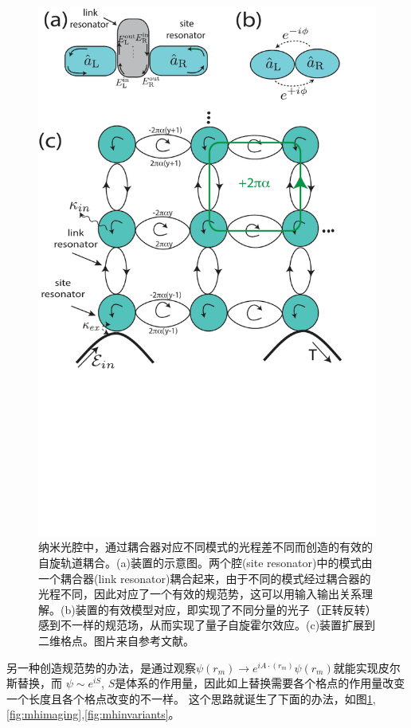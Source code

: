 \documentclass[supercite]{HustGraduPaper}
\begin{document}
\begin{figure}
	\centering
	\includegraphics[width=0.9\linewidth]{Figures/topphoto/MH_lattice}
	\caption{纳米光腔中，通过耦合器对应不同模式的光程差不同而创造的有效的自旋轨道耦合。(a)装置的示意图。两个腔(site resonator)中的模式由一个耦合器(link resonator)耦合起来，由于不同的模式经过耦合器的光程不同，因此对应了一个有效的规范势，这可以用输入输出关系理解。(b)装置的有效模型对应，即实现了不同分量的光子（正转反转）感到不一样的规范场，从而实现了量子自旋霍尔效应。(c)装置扩展到二维格点。图片来自参考文献\cite{hafezi2011robust}。}
	\label{fig:mhlattice}
\end{figure}
另一种创造规范势的办法，是通过观察$\psi(r_m) \to e^{i A\cdot (r_m)} \psi(r_m)$就能实现皮尔斯替换，而
$\psi \sim e^{iS}$, $S$是体系的作用量，因此如上替换需要各个格点的作用量改变一个长度且各个格点改变的不一样。
这个思路就诞生了下面的办法，如图\ref{fig:mhlattice}, \ref{fig:mhimaging},\ref{fig:mhinvariants}。
\end{document}
